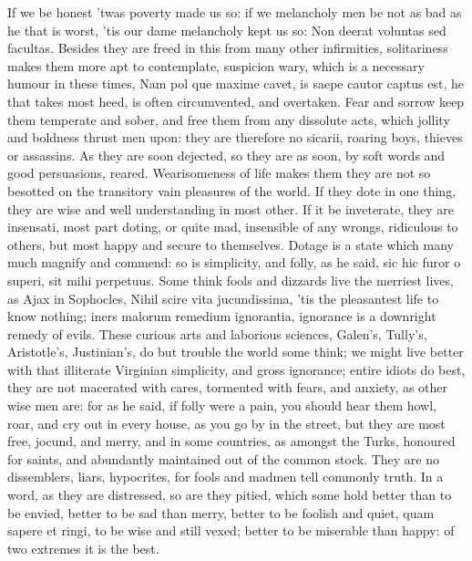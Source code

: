 {If we be honest 'twas poverty made us so: if we melancholy men be not
as bad as he that is worst, 'tis our dame melancholy kept us so: Non
deerat voluntas sed facultas. 
Besides they are freed in this from many other infirmities,
solitariness makes them more apt to contemplate, suspicion wary, which
is a necessary humour in these times, Nam pol que maxime cavet,
is saepe cautor captus est, he that takes most heed, is often
circumvented, and overtaken. Fear and sorrow keep them temperate and
sober, and free them from any dissolute acts, which jollity and
boldness thrust men upon: they are therefore no sicarii, roaring boys,
thieves or assassins. As they are soon dejected, so they are as soon,
by soft words and good persuasions, reared. Wearisomeness of life makes
them they are not so besotted on the transitory vain pleasures of the
world. If they dote in one thing, they are wise and well understanding
in most other. If it be inveterate, they are insensati, most part
doting, or quite mad, insensible of any wrongs, ridiculous to others,
but most happy and secure to themselves. Dotage is a state which many
much magnify and commend: so is simplicity, and folly, as he said,
sic hic furor o superi, sit mihi perpetuus. Some think fools and
dizzards live the merriest lives, as Ajax in Sophocles, Nihil scire
vita jucundissima, 'tis the pleasantest life to know nothing; iners
malorum remedium ignorantia, ignorance is a downright remedy of evils.
These curious arts and laborious sciences, Galen's, Tully's,
Aristotle's, Justinian's, do but trouble the world some think; we might
live better with that illiterate Virginian simplicity, and gross
ignorance; entire idiots do best, they are not macerated with cares,
tormented with fears, and anxiety, as other wise men are: for as
he said, if folly were a pain, you should hear them howl, roar,
and cry out in every house, as you go by in the street, but they are
most free, jocund, and merry, and in some countries, as amongst
the Turks, honoured for saints, and abundantly maintained out of the
common stock. They are no dissemblers, liars, hypocrites, for
fools and madmen tell commonly truth. In a word, as they are
distressed, so are they pitied, which some hold better than to be
envied, better to be sad than merry, better to be foolish and quiet,
quam sapere et ringi, to be wise and still vexed; better to be
miserable than happy: of two extremes it is the best.


}
